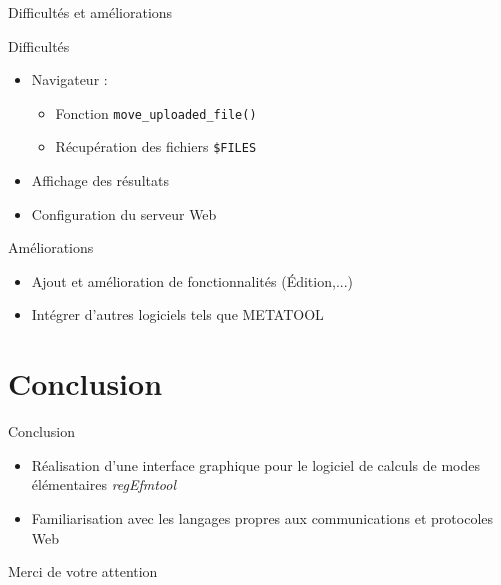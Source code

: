 \documentclass{beamer}
\begin{document}
\begin{frame}{\textcolor{bleu2}{\hspace{1cm}Difficultés et améliorations}}
	\begin{block}{\hspace{0.2cm}Difficultés}
		\begin{itemize}
			\item Navigateur :
			\begin{itemize}
				\item Fonction \texttt{move\_uploaded\_file()}
				\item Récupération des fichiers \texttt{\$FILES}
			\end{itemize}
			\item Affichage des résultats
			\item Configuration du serveur Web
		\end{itemize}
	\end{block}
	\begin{block}{\hspace{0.2cm}Améliorations}
		\begin{itemize}
			\item Ajout et amélioration de fonctionnalités (Édition,...)
			\item Intégrer d'autres logiciels tels que METATOOL
		\end{itemize}
	\end{block}
\end{frame}

\section*{Conclusion}

\begin{frame}{\textcolor{bleu2}{\hspace{1cm}Conclusion}}
	\begin{itemize}
	\item Réalisation d'une interface graphique pour le logiciel de calculs de modes élémentaires \emph{regEfmtool}
	\item Familiarisation avec les langages propres aux communications et protocoles Web
	\end{itemize}
\end{frame}

\begin{frame}{}
	\begin{center}
		\textcolor{bleu2}{\hspace{1cm}Merci de votre attention}
	\end{center}
\end{frame}
\end{document}
